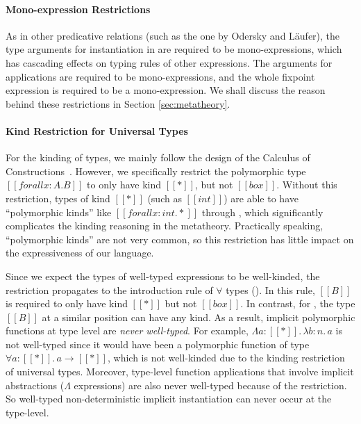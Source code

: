 \paragraph{Mono-expression Restrictions}
As in other predicative relations (such as the one by Odersky and L\"aufer),
the type arguments for instantiation in  are
required to be mono-expressions, which has cascading effects on typing rules of
other expressions. The arguments for applications are required to be
mono-expressions, and the whole fixpoint expression is required to be a
mono-expression. We shall
discuss the reason behind these restrictions in Section \ref{sec:metatheory}.

\paragraph{Kind Restriction for Universal Types}
\label{sec:kind-restriction}

For the kinding of types, we mainly follow the design of the Calculus of
Constructions~\citep{coc}. However, we specifically restrict
the polymorphic type $[[forall x : A. B]]$ to only have kind $[[*]]$, but not $[[box]]$.
Without this restriction, types of kind $[[*]]$ (such as $[[int]]$) are able to
have ``polymorphic kinds'' like $[[forall x : int. *]]$ through ,
which significantly complicates the kinding reasoning in the metatheory.
Practically speaking, ``polymorphic kinds'' are not very common, so this
restriction has little impact on the expressiveness of our language.

Since we expect the types of well-typed expressions to be well-kinded,
the restriction propagates to the introduction rule of $\forall$ types ().
In this rule, $[[B]]$ is required to only have kind $[[*]]$ but not $[[box]]$.
In contrast, for , the type $[[B]]$ at a similar position can have any kind.
As a result, implicit polymorphic functions at type level are \emph{never well-typed}.
For example, $\Lambda a : [[*]].\, \lambda b : n.\, a$ is not
well-typed since it would have been a polymorphic function of type
$\forall a : [[*]].\, a \rightarrow [[*]]$, which is not well-kinded due to the
kinding restriction of universal types.
Moreover, type-level function applications that involve implicit
abstractions ($\Lambda$ expressions) are also never well-typed
because of the restriction. So well-typed non-deterministic implicit instantiation can never occur
at the type-level.

